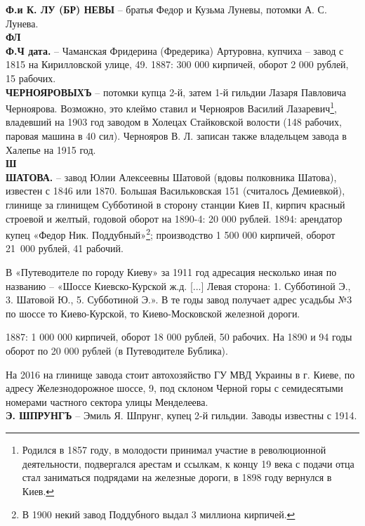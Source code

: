 \noindent\textbf{Ф.и К. ЛУ (БР) НЕВЫ} – братья Федор и Кузьма Луневы, потомки А. С. Лунева.\\

\noindent\textbf{ФЛ}\\

\noindent\textbf{Ф.Ч дата.} – Чаманская Фридерина (Фредерика) Артуровна, купчиха – завод с 1815 на Кирилловской улице, 49. 1887: 300 000 кирпичей, оборот 2 000 рублей, 15 рабочих.\\

\noindent\textbf{ЧЕРНОЯРОВЫХЪ} – потомки купца 2-й, затем 1-й гильдии Лазаря Павловича Черноярова. Возможно, это клеймо ставил и Чернояров Василий Лазаревич\footnote{Родился в 1857 году, в молодости принимал участие в революционной деятельности, подвергался арестам и ссылкам, к концу 19 века с подачи отца стал заниматься подрядами на железные дороги, в 1898 году вернулся в Киев.}, владевший на 1903 год заводом в Холецах Стайковской волости (148 рабочих, паровая машина в 40 сил). Чернояров В. Л. записан также владельцем завода в Халепье на 1915 год.\\

\noindent\textbf{Ш}\\

\noindent\textbf{ШАТОВА.} – завод Юлии Алексеевны Шатовой (вдовы полковника Шатова), известен с 1846 или 1870. Большая Васильковская 151 (считалось Демиевкой), глинище за глинищем Субботиной в сторону станции Киев II, кирпич красный строевой и желтый, годовой оборот на 1890-4: 20 000 рублей. 1894: арендатор купец «Федор Ник. Поддубный»\footnote{В 1900 некий завод Поддубного выдал 3 миллиона кирпичей.}; производство 1 500 000 кирпичей, оборот \mbox{21 000} рублей, 41 рабочий.

В «Путеводителе по городу Киеву» за 1911 год адресация несколько иная по названию – «Шоссе Киевско-Курской ж.д. [...] Левая сторона: 1. Субботиной Э., 3. Шатовой Ю., 5. Субботиной Э.». В те годы завод получает адрес усадьбы №3 по шоссе то Киево-Курской, то Киево-Московской железной дороги.

1887: 1 000 000 кирпичей, оборот 18 000 рублей, 50 рабочих. На 1890 и 94 годы оборот по 20 000 рублей (в Путеводителе Бублика). 

На 2016 на глинище завода стоит автохозяйство ГУ МВД Украины в г. Киеве, по адресу Железнодорожное шоссе, 9, под склоном Черной горы с семидесятыми номерами частного сектора улицы Менделеева.\\

\noindent\textbf{Э. ШПРУНГЪ} – Эмиль Я. Шпрунг, купец 2-й гильдии. Заводы известны с 1914.

